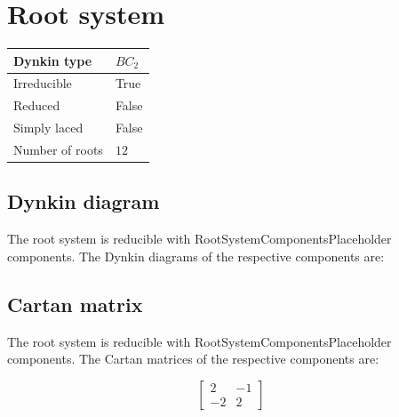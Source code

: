 \documentclass[11pt]{article}
\theoremstyle{definition}
\newif\ifrootsystemirreducible
\begin{document}
\newpage
\section{Root system}

\begin{tabular}{|l|l|}
	\hline
    Dynkin type & $BC_2$ \\
	\hline
    Irreducible & True \\
	\hline
    Reduced & False \\
	\hline
	Simply laced & False \\
	\hline
	Number of roots & $12$ \\
	\hline
\end{tabular}

\subsection{Dynkin diagram}

\ifrootsystemirreducible
The root system is irreducible and has Dynkin diagram:
\else
The root system is reducible with RootSystemComponentsPlaceholder components. The Dynkin diagrams of the respective components are:
\fi

\begin{center}
\end{center}

\subsection{Cartan matrix}

\ifrootsystemirreducible
The root system is irreducible and has Cartan matrix:
\else
The root system is reducible with RootSystemComponentsPlaceholder components. The Cartan matrices of the respective components are:
\fi

\[
\left[\begin{matrix}2 & -1\\-2 & 2\end{matrix}\right]
\]
\end{document}
